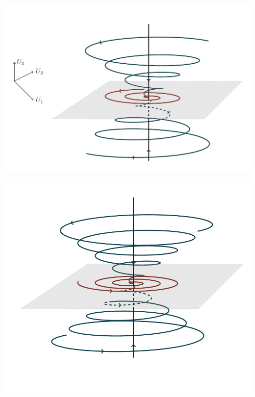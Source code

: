 \begin{center}
    \begin{minipage}{0.32\linewidth}
        \includegraphics[width=\linewidth]{fig/55_1.jpg} 
        \vspace{-50pt}
        \label{fig:1}
    \end{minipage}
\hfill     
    \begin{minipage}{0.3\linewidth}
        \includegraphics[width=\linewidth]{fig/55_2.jpg} 
        \vspace{-50pt}
        \label{fig:1}
    \end{minipage}
\hfill     
    \begin{minipage}{0.3\linewidth}

\end{minipage}
\end{center}
